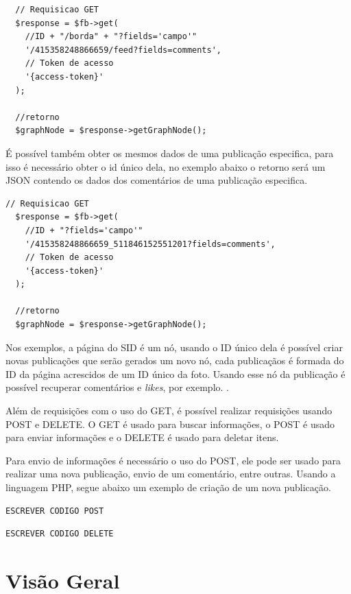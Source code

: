 \begin{lstlisting}
  // Requisicao GET
  $response = $fb->get(
  	//ID + "/borda" + "?fields='campo'"
    '/415358248866659/feed?fields=comments',
    // Token de acesso
    '{access-token}' 
  );
  
  //retorno
  $graphNode = $response->getGraphNode(); 
\end{lstlisting}

É possível também obter os mesmos dados de uma publicação especifica, para isso é necessário obter o id único dela, no exemplo abaixo o retorno será um JSON contendo os dados dos comentários de uma publicação especifica.

\begin{lstlisting}
// Requisicao GET
  $response = $fb->get(
  	//ID + "?fields='campo'"
    '/415358248866659_511846152551201?fields=comments',
	// Token de acesso    
    '{access-token}'
  );
  
  //retorno
  $graphNode = $response->getGraphNode();
\end{lstlisting}

Nos exemplos, a página do SID é um nó, usando o ID único dela é possível criar novas publicações que serão gerados um novo nó, cada publicaçãos é formada do ID da página acrescidos de um ID único da foto. Usando esse nó da publicação é possível recuperar comentários e \textit{likes}, por exemplo. \cite{facebook2018b}.

Além de requisições com o uso do GET, é possível realizar requisições usando POST e DELETE. O GET é usado para buscar informações, o POST é usado para enviar informações e o DELETE é usado para deletar itens.

Para envio de informações é necessário o uso do POST, ele pode ser usado para realizar uma nova publicação, envio de um comentário, entre outras. Usando a linguagem PHP, segue abaixo um exemplo de criação de um nova publicação.
\begin{lstlisting}
ESCREVER CODIGO POST
\end{lstlisting}

\begin{lstlisting}
ESCREVER CODIGO DELETE
\end{lstlisting}

\section{Visão Geral}

